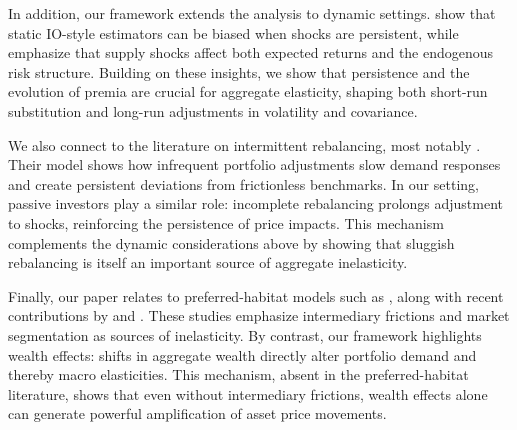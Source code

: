 In addition, our framework extends the analysis to dynamic settings. \cite{Binsbergen-David-Opp2025} show that static IO-style estimators can be biased when shocks are persistent, while \cite{he-kondor-Li2025demand} emphasize that supply shocks affect both expected returns and the endogenous risk structure. Building on these insights, we show that persistence and the evolution of premia are crucial for aggregate elasticity, shaping both short-run substitution and long-run adjustments in volatility and covariance. 

We also connect to the literature on intermittent rebalancing, most notably \cite{ChienColeLustig2012}. Their model shows how infrequent portfolio adjustments slow demand responses and create persistent deviations from frictionless benchmarks. In our setting, passive investors play a similar role: incomplete rebalancing prolongs adjustment to shocks, reinforcing the persistence of price impacts. This mechanism complements the dynamic considerations above by showing that sluggish rebalancing is itself an important source of aggregate inelasticity. 

Finally, our paper relates to preferred-habitat models such as \cite{VayanosVila2021}, along with recent contributions by \cite{KekreLenelMainardi2025} and \cite{RayDroste2025}. These studies emphasize intermediary frictions and market segmentation as sources of inelasticity. By contrast, our framework highlights wealth effects: shifts in aggregate wealth directly alter portfolio demand and thereby macro elasticities. This mechanism, absent in the preferred-habitat literature, shows that even without intermediary frictions, wealth effects alone can generate powerful amplification of asset price movements. 


